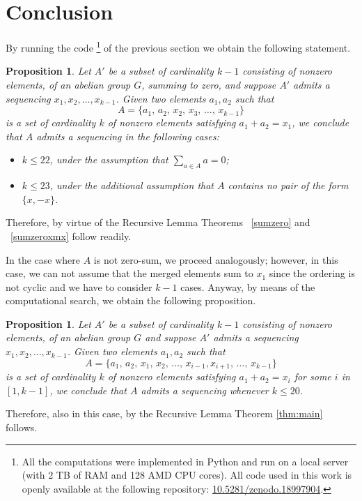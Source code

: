 \documentclass[11pt]{amsart}
\newtheorem{proposition}[theorem]{Proposition}
\theoremstyle{definition}
\begin{document}
\section{Conclusion}

By running the code \footnote{All the computations were implemented in Python and run on a local server (with 2 TB of RAM and 128 AMD CPU cores). All code used in this work is openly available at the following repository:  \href{https://doi.org/10.5281/zenodo.18997904}{10.5281/zenodo.18997904}.} of the previous section we obtain the following statement. 
\begin{proposition}\label{prop1}
    Let $A'$ be a subset of cardinality $k-1$ consisting of nonzero elements, of an abelian group $G$, summing to zero, 
and suppose $A'$ admits a sequencing $x_1, x_2, \ldots, x_{k-1}$. 
Given two elements $a_1, a_2$ such that
$$
A = \{a_1,\, a_2,\, x_2,\, x_3,\, \ldots,\, x_{k-1}\}
$$
is a set of cardinality $k$ of nonzero elements satisfying $a_1 + a_2 = x_1$, 
we conclude that $A$ admits a sequencing in the following cases:
\begin{itemize}
    \item $k \leq 22$, under the assumption that $\sum_{a \in A} a = 0$;
    \item $k \leq 23$, under the additional assumption that $A$ contains no pair 
    of the form $\{x, -x\}$.
\end{itemize}
\end{proposition}
Therefore, by virtue of the Recursive Lemma Theorems 
~\ref{sumzero}  and ~\ref{sumzeroxmx} follow readily.

In the case where $A$ is not zero-sum, we proceed analogously; however, in this case, we can not assume that the merged elements sum to $x_1$ since the ordering is not cyclic and we have to consider $k-1$ cases. Anyway, by means of the computational search, we obtain the following proposition.

\begin{proposition}\label{prop2}
    Let $A'$ be a subset of cardinality $k-1$ consisting of nonzero elements, of an abelian group $G$ and suppose $A'$ admits a sequencing $x_1, x_2, \ldots, x_{k-1}$. 
Given two elements $a_1, a_2$ such that
$$
A = \{a_1,\, a_2,\, x_1,\, x_2,\, \ldots,\,x_{i-1},x_{i+1},\, \ldots,\, x_{k-1}\}
$$
is a set of cardinality $k$ of nonzero elements satisfying $a_1 + a_2 = x_i$ for some $i$ in $[1,k-1]$, 
we conclude that $A$ admits a sequencing whenever $k\leq 20$.
\end{proposition}
Therefore, also in this case, by the Recursive Lemma Theorem \ref{thm:main} follows.
\end{document}
